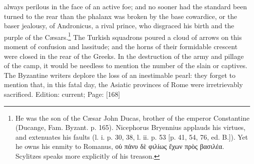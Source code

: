 always perilous in the face of an active foe; and no sooner had the standard been turned to the rear than the phalanx was broken by the base cowardice, or the baser jealousy, of Andronicus, a rival prince, who disgraced his birth and the purple of the Cæsars.\footnote{He was the son of the Cæsar John Ducas, brother of the emperor Constantine (Ducange, Fam. Byzant. p. 165). Nicephorus Bryennius applauds his virtues, and extenuates his faults (l. i. p. 30, 38, l. ii. p. 53 [p. 41, 54, 76, ed. B.]). Yet he owns his enmity to Romanus, \textgreek{ο\texthebrew{ὐ} πάνυ δ\texthebrew{ὲ} φιλίως \texthebrew{ἔ}χων πρ\texthebrew{ὸ}ς βασιλέα}. Scylitzes speaks more explicitly of his treason.} The Turkish squadrons poured a cloud of arrows on this moment of confusion and lassitude; and the horns of their formidable crescent were closed in the rear of the Greeks. In the destruction of the army and pillage of the camp, it would be needless to mention the number of the slain or captives. The Byzantine writers deplore the loss of an inestimable pearl: they forget to mention that, in this fatal day, the Asiatic provinces of Rome were irretrievably sacrificed.
Edition: current; Page: [168]

